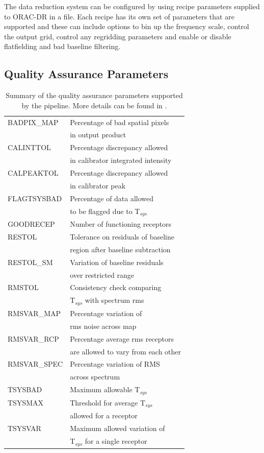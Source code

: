 \documentclass[final,authoryear,5p,times,twocolumn]{elsarticle}
\begin{document}
The data reduction system can be configured by using recipe parameters
supplied to ORAC-DR in a file. Each recipe has its own set of
parameters that are supported and these can include options to bin up
the frequency scale, control the output grid, control any regridding
parameters and enable or disable flatfielding and bad baseline filtering.

\subsection{Quality Assurance Parameters \label{sec:qa}}

\begin{table}
  \caption{Summary of the quality assurance parameters supported by
    the pipeline. More details can be found in \citep{2008JCMTLSQA}.}
\label{tab:qa:params}
\begin{tabular}{ll}
BADPIX\_MAP  & Percentage of bad spatial pixels\\
   & in output product\\
CALINTTOL & Percentage discrepancy allowed\\
    &  in calibrator integrated intensity \\
CALPEAKTOL & Percentage discrepancy allowed\\
    & in calibrator peak\\
FLAGTSYSBAD & Percentage of data allowed \\
   & to be flagged due to T$_{sys}$\\
GOODRECEP & Number of functioning receptors\\
RESTOL & Tolerance on residuals of baseline \\
   & region after baseline subtraction\\
RESTOL\_SM & Variation of baseline residuals \\
  & over restricted range\\
RMSTOL & Consistency check comparing\\
  & T$_{sys}$ with spectrum rms\\
RMSVAR\_MAP & Percentage variation of\\
  & rms noise across map \\
RMSVAR\_RCP &  Percentage average rms receptors\\
  & are allowed to vary from each other\\
RMSVAR\_SPEC & Percentage variation of RMS\\
  & across spectrum \\
TSYSBAD &  Maximum allowable T$_{sys}$\\
TSYSMAX & Threshold for  average T$_{sys}$ \\
  & allowed for a receptor\\
TSYSVAR &  Maximum allowed variation of\\
  & T$_{sys}$ for a single receptor\\
\end{tabular}
\end{table}
\end{document}
